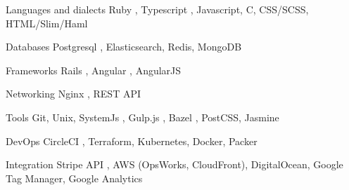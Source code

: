 

\begin{cvskills}

  \cvskill
    {Languages and dialects} %
    {Ruby {\color{awesome-concrete} \faStar}, Typescript {\color{awesome-concrete} \faStar}, Javascript, C, CSS/SCSS, HTML/Slim/Haml} %

  \cvskill
    {Databases} %
    {Postgresql {\color{awesome-concrete} \faStar}, Elasticsearch, Redis, MongoDB} %

  \cvskill
    {Frameworks} %
    {Rails {\color{awesome-concrete} \faStar}, Angular {\color{awesome-concrete} \faStar}, AngularJS} %

  \cvskill
    {Networking} %
    {Nginx {\color{awesome-concrete} \faStar}, REST API {\color{awesome-concrete} \faStar}} %

  \cvskill
    {Tools} %
    {Git, Unix, SystemJs {\color{awesome-concrete} \faStar}, Gulp.js {\color{awesome-concrete} \faStar}, Bazel {\color{awesome-concrete} \faStar}, PostCSS, Jasmine} %

  \cvskill
    {DevOps} %
    {CircleCI {\color{awesome-concrete} \faStar}, Terraform, Kubernetes, Docker, Packer} %


  \cvskill
    {Integration} %
    {Stripe API {\color{awesome-concrete} \faStar}, AWS (OpsWorks, CloudFront), DigitalOcean, Google Tag Manager, Google Analytics} %


\end{cvskills}
